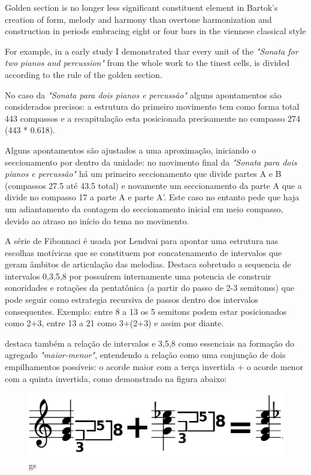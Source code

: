 \documentclass[
	12pt,				%
	openright,			%
	twoside,			%
	a4paper,			%
	english,			%
	french,				%
	spanish,			%
	brazil				%
	]{abntex2}
\begin{document}
\begin{citacao}
Golden section is no longer less significant constituent element in Bartok's creation of form, melody and harmony than overtone harmonization and construction in periods embracing eight or four bars in the viennese classical style

For example, in a early study I demonstrated thar every unit of the \textit{"Sonata for two pianos and percussion"} from the whole work to the tinest cells, is divided according to the rule of the golden section.\cite[ p.175]{lendvai1962duality}
\end{citacao}

No caso da \textit{"Sonata para dois pianos e percussão"} alguns apontamentos são considerados precisos: a estrutura do primeiro movimento tem como forma total 443 compassos e a recapitulação esta posicionada precisamente no compasso 274 (443 * 0.618).

Alguns apontamentos são ajustados a uma aproximação, iniciando o seccionamento por dentro da unidade: no movimento final da \textit{"Sonata para dois pianos e percussão"} há um primeiro seccionamento que divide partes A e B (compassos 27.5 até 43.5 total) e novamente um seccionamento da parte A que a divide no compasso 17 a parte A e parte A'. Este caso no entanto pede que haja um adiantamento da contagem do seccionamento inicial em meio compasso, devido ao atraso no início do tema no movimento.

A série de Fibonnaci é usada por Lendvai para apontar uma estrutura nas escolhas motívicas que se constituem por concatenamento de intervalos que geram âmbitos de articulação das melodias. Destaca sobretudo a sequencia de intervalos 0,3,5,8 por possuírem internamente uma potencia de construir sonoridades e rotações da pentatônica (a partir do passo de 2-3 semitonss) que pode seguir como estrategia recursiva de passos dentro dos intervalos consequentes. Exemplo: entre 8 a 13 os 5 semitons podem estar posicionados como 2+3, entre 13 a 21 como 3+(2+3) e assim por diante.

 destaca também a relação de intervalos e 3,5,8 como essenciais na formação do agregado \textit{"maior-menor"}, entendendo a relação como uma conjunção de dois empilhamentos possíveis: o acorde maior com a terça invertida + o acorde menor com a quinta invertida, como demonstrado na figura abaixo:

\begin{figure}[!h]
	\caption{\label{fig_grafico}gs  }
	\begin{center}
	    \includegraphics[scale=0.3]{axis/GS_maior_menor.png}
	\end{center}
\end{figure} 
\end{document}
